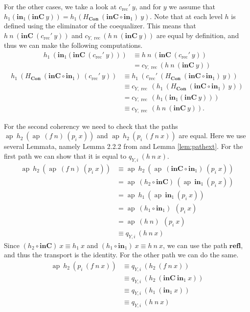 \documentclass[a4paper,UKenglish]{lipics-v2016}
\newcommand{\Boperator}[1]{\mathrm{\mathbf{#1}}}
\newcommand{\inn}{\Boperator{in}}
\newcommand{\rec}[0]{\operatorname{rec}}
\newcommand{\ap}[0]{\operatorname{ap}}
\newcommand{\Con}[0]{\textbf{Con}}
\newcommand{\refl}[0]{\Boperator{refl}}
\newcommand{\inC}[0]{\Boperator{inC}}
\begin{document}
For the other cases, we take a look at $c_{\rec}' \> y$, and for $y$ we assume that $h_1(\inn_1(\inC \> y)) = h_1(H_{\Con} \> (\inC \circ \inn_1) \> y)$.
Note that at each level $h$ is defined using the eliminator of the coequalizer.
This means that $h \> n \> (\inC \> (c_{\rec}' \> y))$ and $c_{Y, \rec}(h \> n \> (\inC \> y))$ are equal by definition, and thus we can make the following computations.
\begin{equation*}
\begin{split}
h_1 \> (\inn_1(\inC \> (c_{\rec}' \> y))) 
&\equiv 
h \> n \> (\inC \> (c_{\rec}' \> y))\\
&
= c_{Y, \rec} (h \> n \> (\inC \> y))
\end{split}
\end{equation*}
\begin{equation*}
\begin{split}
h_1 \> (H_{\Con} \> (\inC \circ \inn_1) \> (c_{\rec}' \> y)) 
&\equiv 
h_1 \> (c_{\rec}' \> (H_{\Con} \> (\inC \circ \inn_1) \> y))
\\
&\equiv
c_{Y, \rec} \> (h_1 \> (H_{\Con} \> (\inC \circ \inn_1) \> y))\\
&=
c_{Y, \rec} \> (h_1(\inn_1(\inC \> y)))\\
&\equiv
c_{Y, \rec} \> (h \> n \> (\inC \> y)).
\end{split}
\end{equation*}


For the second coherency we need to check that the paths $\ap \> h_2 \> (\ap \> (f \> n) \> (p_i \> x))$ and $\ap \> h_2 \> (p_i \> (f \> n \> x))$ are equal.
Here we use several Lemmata, namely Lemma 2.2.2 from \cite{hottbook} and Lemma \ref{lem:pathext}.
For the first path we can show that it is equal to $q_{Y, i} \> (h \> n \> x)$.
\begin{equation*}
\begin{split}
\ap \> h_2 \> (\ap \> (f \> n) \> (p_i \> x))
&\equiv
\ap \> h_2 \> (\ap \> (\inC \circ \inn_1) \> (p_i \> x))\\
&=
\ap \> (h_2 \circ \inC) \> (\ap \> \inn_1 \> (p_i \> x))\\
&=
\ap \> h_1 \> (\ap \> \inn_1 \> (p_i \> x))\\
&=
\ap \> (h_1 \circ \inn_1) \> \> (p_i \> x)\\
&=
\ap \> (h \> n) \> \> (p_i \> x)\\
&\equiv
q_{Y, i} \> (h \> n \> x)
\end{split}
\end{equation*}
Since $(h_2 \circ \inC) \> x \equiv h_1 \> x$ and $(h_1 \circ \inn_1) \> x \equiv h \> n \> x$, we can use the path $\refl$, and thus the transport is the identity.
For the other path we can do the same.
\begin{equation*}
\begin{split}
\ap \> h_2 \> (p_i \> (f \> n \> x))
&\equiv
q_{Y, i} \> (h_2 \> (f \> n \> x))\\
&\equiv
q_{Y, i} \> (h_2 \> (\inC \> \inn_1 \> x))\\
&\equiv
q_{Y, i} \> (h_1 \> (\inn_1 \> x))\\
&\equiv
q_{Y, i} \> (h \> n \> x)
\end{split}
\end{equation*}
\end{document}
